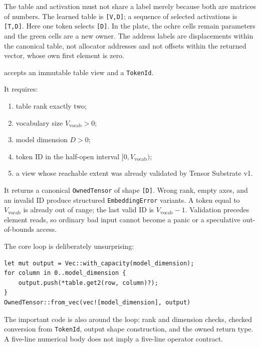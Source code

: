 The table and activation must not share a label merely because both are
matrices of numbers. The learned table is \texttt{{[}V,D{]}}; a sequence
of selected activations is \texttt{{[}T,D{]}}. Here one token selects
\texttt{{[}D{]}}. In the plate, the ochre cells remain parameters and
the green cells are a new owner. The address labels are displacements
within the canonical table, not allocator addresses and not offsets
within the returned vector, whose own first element is zero.

\texttt{} accepts an immutable
table view and a \texttt{TokenId}.


It requires:

\begin{enumerate}
\def\labelenumi{\arabic{enumi}.}
\tightlist
\item
  table rank exactly two;
\item
  vocabulary size \(V_{\mathrm{vocab}}>0\);
\item
  model dimension \(D>0\);
\item
  token ID in the half-open interval \([0,V_{\mathrm{vocab}})\);
\item
  a view whose reachable extent was already validated by Tensor
  Substrate v1.
\end{enumerate}

It returns a canonical \texttt{OwnedTensor} of shape \texttt{{[}D{]}}.
Wrong rank, empty axes, and an invalid ID produce structured
\texttt{EmbeddingError} variants. A token equal to
\(V_{\mathrm{vocab}}\) is already out of range; the last valid ID is
\(V_{\mathrm{vocab}}-1\). Validation precedes element reads, so ordinary
bad input cannot become a panic or a speculative out-of-bounds access.

The core loop is deliberately unsurprising:

\begin{verbatim}
let mut output = Vec::with_capacity(model_dimension);
for column in 0..model_dimension {
    output.push(*table.get2(row, column)?);
}
OwnedTensor::from_vec(vec![model_dimension], output)
\end{verbatim}

The important code is also around the loop: rank and dimension checks,
checked conversion from \texttt{TokenId}, output shape construction, and
the owned return type. A five-line numerical body does not imply a
five-line operator contract.

